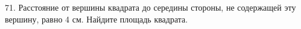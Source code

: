 71. Расстояние от вершины квадрата до середины стороны, не содержащей эту вершину, равно 4 см. Найдите площадь квадрата.\\
